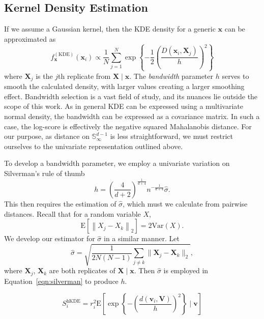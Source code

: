\subsection{Kernel Density Estimation}

If we assume a Gaussian kernel, then the KDE density for a generic $\bm{x}$ can 
    be approximated as 
    \begin{equation}
        \label{eq:ad_kde}
        f_{\bm{x}}^{(\text{KDE})}(\bm{x}_i) \propto 
        \frac{1}{N}\sum_{j = 1}^{N}\exp
        \left\lbrace-\frac{1}{2}\left(
        \frac{D(\bm{x}_i,\bm{X}_j)}{h}\right)^2\right\rbrace
    \end{equation}
    where $\bm{X}_j$ is the $j$th 
    replicate from $\bm{X}\mid\bm{x}$.  The \emph{bandwidth} parameter $h$ 
    serves to smooth the calculated density, with larger values creating a 
    larger smoothing effect.  Bandwidth selection is a vast field of study, and 
    its nuances lie outside the scope of this work.  As in general KDE can be 
    expressed using a multivariate normal density, the bandwidth can be 
    expressed as a covariance matrix.  In such a case, the log-score is 
    effectively the negative squared Mahalanobis distance.  For our purpose, as 
    distance on $\mathbb{S}_{\infty}^{d-1}$ is less straightforward, we must 
    restrict ourselves to the univariate representation outlined above.

To develop a bandwidth parameter, we employ a univariate variation on 
    Silverman's rule of thumb
    \begin{equation}
        \label{eqn:silverman}
        h = \left(\frac{4}{d+2}\right)^{
            \frac{1}{d+4}}n^{-\frac{1}{d+4}}\hat{\sigma}.
    \end{equation}
    This then requires the estimation of $\hat{\sigma}$, which must we calculate 
    from pairwise distances. Recall that for a random variable $X$, 
    \[ 
        \text{E}\left[\left\lVert X_j - X_k\right\rVert_2\right] 
            = 2\text{Var}(X). 
    \]
    We develop our estimator for $\hat{\sigma}$ in a similar manner.  Let
    \[
        \hat{\sigma} = \sqrt{\frac{1}{2N(N-1)}\sum_{j\neq k}\lVert 
            \bm{X}_j - \bm{X}_k\rVert_2},
    \]
    where $\bm{X}_j$, $\bm{X}_k$ are both replicates of $\bm{X}\mid\bm{x}$. Then 
    $\hat{\sigma}$ is employed in Equation~\ref{eqn:silverman} to produce $h$.
 
\begin{equation}
    \label{eqn:ad_kde_h}
    S_i^{\text{hKDE}} = r_i^{2}\text{E}\left[\exp\left\lbrace -
    \left(\frac{d(\bm{v}_i,\bm{V})}{h}\right)^2\right\rbrace\mid\bm{v}\right]
\end{equation}

